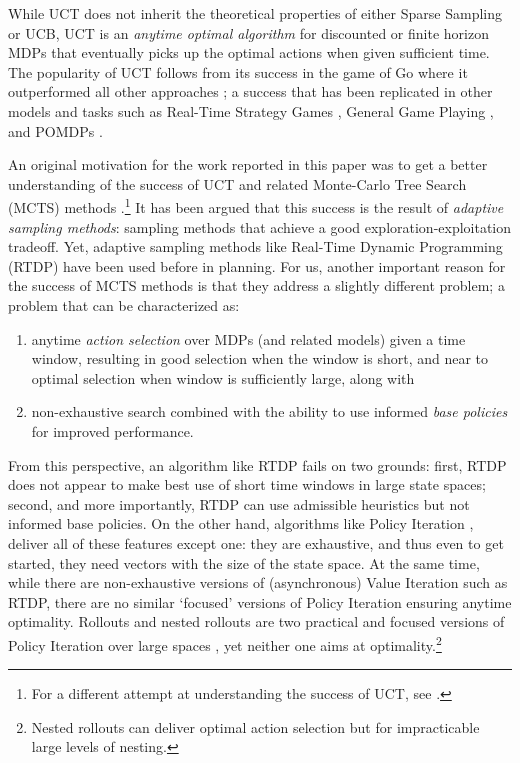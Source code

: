 \documentclass[letterpaper]{article}
\begin{document}
While UCT does not inherit the theoretical properties of either Sparse Sampling or UCB,
UCT is an \emph{anytime optimal algorithm} for discounted or finite horizon MDPs that
eventually picks up the optimal actions when given sufficient time. The popularity of
UCT follows from its success in the game of Go where it outperformed all other approaches \cite{uct:go}; a success that
has been replicated in other models and tasks such as   Real-Time Strategy Games \cite{fern:uct},
General Game Playing \cite{uct:ggp}, and POMDPs \cite{silver:pomdps}.

An original  motivation for the work reported in this paper was to get a better understanding
of  the success of UCT and related Monte-Carlo Tree Search (MCTS) methods \cite{mcts}.\footnote{
For a different attempt at understanding the success of UCT, see \cite{selman:uct}.}
It has been argued that this  success is the result of \emph{adaptive sampling methods}: sampling methods that achieve a good
exploration-exploitation tradeoff. Yet, adaptive sampling methods like  Real-Time Dynamic Programming  (RTDP)  \cite{barto:rtdp}
have been used before in planning. For us,  another important reason  for the success of MCTS  methods is that
they address a slightly different problem; a problem that can be characterized as:

\begin{enumerate}[1.]
\item {anytime} \emph{action selection} over MDPs (and related models) given a time window, resulting in
good selection when the window is short, and  near to optimal selection when window is sufficiently large, along with
\item non-exhaustive  search combined with the ability to  use  informed \emph{base policies} for improved performance.
\end{enumerate} From this perspective, an algorithm like RTDP fails on two grounds: first, RTDP does not
appear to make best use of short time windows in large state spaces;  second, and more importantly,
RTDP  can use admissible heuristics but not informed base policies.  On the other hand, algorithms
like Policy Iteration \cite{howard:pi}, deliver all of these features except one: they are exhaustive, and thus even to get started,
they need vectors  with the size of the state space. At the same time, while there are non-exhaustive versions
of (asynchronous) Value Iteration such as RTDP, there are no similar `focused' versions of Policy Iteration
ensuring  anytime optimality. Rollouts and nested rollouts are two practical and focused versions of Policy  Iteration
over large spaces \cite{bertsekas:rollouts,diaconis:nested}, yet neither one aims at optimality.\footnote{
Nested rollouts can deliver optimal action selection  but for impracticable large levels of nesting.}
\end{document}
